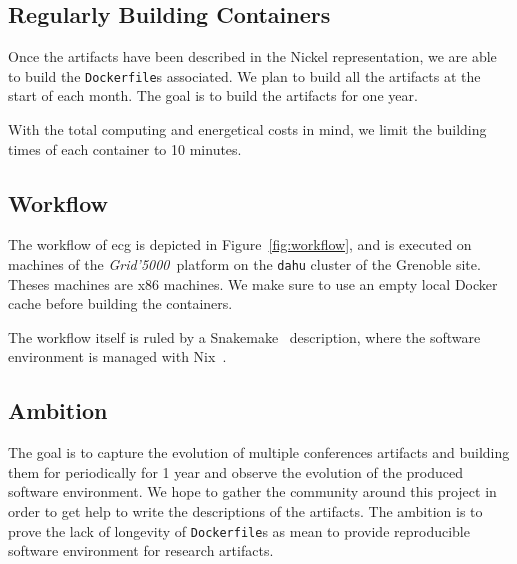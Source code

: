 \documentclass[sigconf,natbib=false]{acmart}
\newcommand{\grid}{\emph{Grid'5000}}
\newcommand{\df}{\texttt{Dockerfile}}
\newcommand{\ecg}{\texttt{ecg}}
\newcommand{\todo}[1]{{\color{red}{TODO: #1}}}
\begin{document}
\subsection{Regularly Building Containers}

Once the artifacts have been described in the Nickel representation, we are able to build the \df s associated.
We plan to build all the artifacts at the start of each month.
The goal is to build the artifacts for one year.

\todo{building patterns, exponential decay}


With the total computing and energetical costs in mind, we limit the building times of each container to 10 minutes.


\subsection{Workflow}

\begin{figure*}
  \centering
  \caption{
    Workflow of \ecg.
    Each description of an artifact is verified with the Nickel contract and then converted in a JSON representation.
    This JSON representation is then read by \ecg\ to
    \textit{(i)} download the artifact,
    \textit{(ii)} compute the hash of its content,
    \textit{(iii)} build the container from the \df, and
    \textit{(iv)} extract the software environment information from the built container.
    \ecg\ outputs files containing the information about the artifact and its \df\ .
  }
  \label{fig:workflow}
\end{figure*}

The workflow of ecg is depicted in Figure~\ref{fig:workflow}, and is executed on machines of the \grid\ platform \cite{grid5000} on the \texttt{dahu} cluster of the Grenoble site.
Theses machines are x86 machines.
We make sure to use an empty local Docker cache before building the containers.

The workflow itself is ruled by a Snakemake~\cite{koster2012snakemake} description, where the software environment is managed with Nix~\cite{dolstra_nix_2004}.


\subsection{Ambition}

The goal is to capture the evolution of multiple conferences artifacts and building them for periodically for 1 year and observe the evolution of the produced software environment.
We hope to gather the community around this project in order to get help to write the descriptions of the artifacts.
The ambition is to prove the lack of longevity of \df s as mean to provide reproducible software environment for research artifacts.
\end{document}
